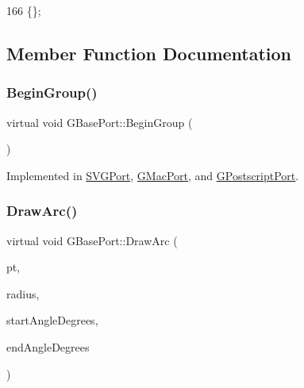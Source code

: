 \begin{DoxyCode}
166 \{\};
\end{DoxyCode}


\subsection{Member Function Documentation}
\mbox{\label{class_g_base_port_ac7aafbb728fe8b61dec2c3f163e2c894}} 
\subsubsection{\texorpdfstring{Begin\+Group()}{BeginGroup()}}
{\footnotesize\ttfamily virtual void G\+Base\+Port\+::\+Begin\+Group (\begin{DoxyParamCaption}{ }\end{DoxyParamCaption})\hspace{0.3cm}{\ttfamily [pure virtual]}}



Implemented in \mbox{\hyperlink{class_s_v_g_port_a75ba37175c0a1fb943e1fd34c1e23f01}{S\+V\+G\+Port}}, \mbox{\hyperlink{class_g_mac_port_a66b95b91c1a03a8200994ed2b7be4d67}{G\+Mac\+Port}}, and \mbox{\hyperlink{class_g_postscript_port_a3efa413a70790ed3e09e9f26c9aa6b2d}{G\+Postscript\+Port}}.

\mbox{\label{class_g_base_port_af9375a9f4cd1bc94ac70eb71c437835a}} 
\subsubsection{\texorpdfstring{Draw\+Arc()}{DrawArc()}}
{\footnotesize\ttfamily virtual void G\+Base\+Port\+::\+Draw\+Arc (\begin{DoxyParamCaption}\item[{const \mbox{\hyperlink{class_g_point}{G\+Point}} \&}]{pt,  }\item[{const int}]{radius,  }\item[{const double}]{start\+Angle\+Degrees,  }\item[{const double}]{end\+Angle\+Degrees }\end{DoxyParamCaption})\hspace{0.3cm}{\ttfamily [pure virtual]}}



